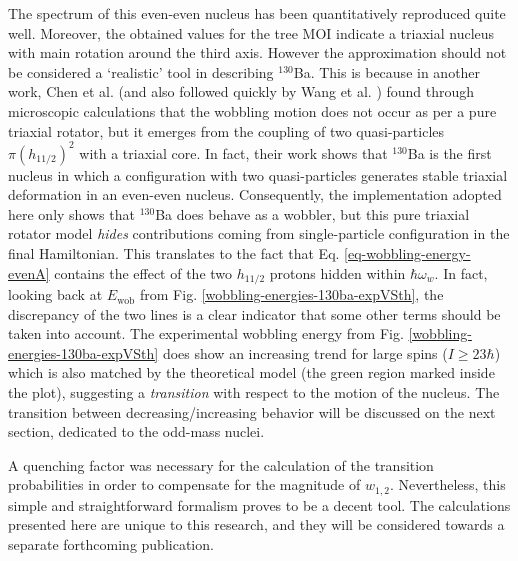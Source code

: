 The spectrum of this even-even nucleus has been quantitatively reproduced quite well. Moreover, the obtained values for the tree MOI indicate a triaxial nucleus with main rotation around the third axis. However the approximation should not be considered a `realistic' tool in describing $^{130}$Ba. This is because in another work, Chen et al. \cite{chen2019transverse} (and also followed quickly by Wang et al. \cite{wang2020two}) found through microscopic calculations that the wobbling motion does not occur as per a pure triaxial rotator, but it emerges from the coupling of two quasi-particles $\pi(h_{11/2})^2$ with a triaxial core. In fact, their work shows that $^{130}$Ba is the first nucleus in which a configuration with two quasi-particles generates stable triaxial deformation in an even-even nucleus. Consequently, the implementation adopted here only shows that $^{130}$Ba does behave as a wobbler, but this pure triaxial rotator model \emph{hides} contributions coming from single-particle configuration in the final Hamiltonian. This translates to the fact that Eq. \ref{eq-wobbling-energy-evenA} contains the effect of the two $h_{11/2}$ protons hidden within $\hbar\omega_w$. In fact, looking back at $E_\text{wob}$ from Fig. \ref{wobbling-energies-130ba-expVSth}, the discrepancy of the two lines is a clear indicator that some other terms should be taken into account. The experimental wobbling energy from Fig. \ref{wobbling-energies-130ba-expVSth} does show an increasing trend for large spins ($I\geq 23\hbar$) which is also matched by the theoretical model (the green region marked inside the plot), suggesting a \emph{transition} with respect to the motion of the nucleus. The transition between decreasing/increasing behavior will be discussed on the next section, dedicated to the odd-mass nuclei.

A quenching factor was necessary for the calculation of the transition probabilities in order to compensate for the magnitude of $w_{1,2}$. Nevertheless, this simple and straightforward formalism proves to be a decent tool. The calculations presented here are unique to this research, and they will be considered towards a separate forthcoming publication.

